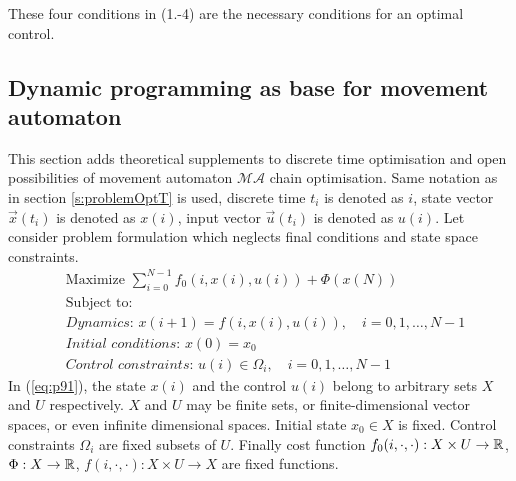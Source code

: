 These four conditions in (1.-4) are the necessary conditions for an optimal control.

\subsection{Dynamic programming as base for movement automaton}\label{s:dynap}
\noindent This section adds theoretical supplements to discrete time optimisation and open possibilities of movement automaton $\mathscr{MA}$ chain optimisation. Same notation as in section \ref{s:problemOptT} is used, discrete time $t_i$ is denoted as $i$, state vector $\vec{x}(t_i)$ is denoted as $x(i)$, input vector $\vec{u}(t_i)$ is denoted as $u(i)$.
\noindent Let consider problem formulation which neglects final conditions and state space constraints.
\begin{equation}\label{eq:p91}
    \begin{split}
        &\text{Maximize } \sum_{i=0}^{N-1} f_0(i,x(i),u(i)) + \Phi(x(N))\\
        &\text{Subject to: }\\
        &\textit{Dynamics: } x(i+1) = f(i,x(i),u(i)),\quad
        i = 0,1,\dots,N-1\\
        &\textit{Initial conditions: } x(0)= x_0\\
        &\textit{Control constraints: } u(i)\in\Omega_i,\quad i = 0,1,\dots
        , N-1
    \end{split}
\end{equation}
\noindent In (\ref{eq:p91}), the state $x(i)$ and the control $u(i)$ belong to arbitrary sets $X$ and $U$ respectively. $X$ and $U$ may be finite sets, or finite-dimensional vector spaces, or even infinite dimensional spaces. Initial state $x_0\in X$ is fixed. Control constraints $\Omega_i$ are fixed subsets of $U$. Finally cost function $f_0(i,\cdot,\cdot):X\times U \to \mathbb{R}$, $\Phi: X \to \mathbb{R}$, $f(i,\cdot,\cdot): X \times U \to X$ are fixed functions.


